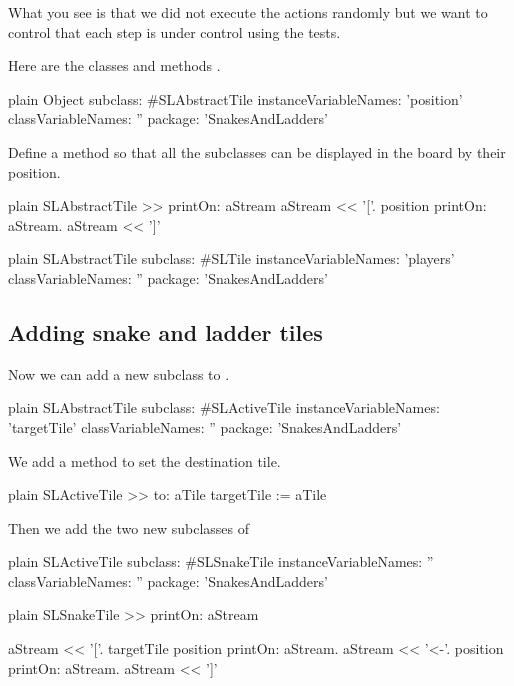 \documentclass[10pt,twoside,english]{_support/latex/sbabook/sbabook}
\begin{document}
What you see is that we did not execute the actions randomly but we want to control that each step is under control using the tests.

Here are the classes and methods .

\begin{displaycode}{plain}
Object subclass: #SLAbstractTile
	instanceVariableNames: 'position'
	classVariableNames: ''
	package: 'SnakesAndLadders'
\end{displaycode}

Define a  method so that all the subclasses can be displayed in the board by their position.

\begin{displaycode}{plain}
SLAbstractTile >> printOn: aStream
	aStream << '['.
	position printOn: aStream.
	aStream << ']'
\end{displaycode}

\begin{displaycode}{plain}
SLAbstractTile subclass: #SLTile
	instanceVariableNames: 'players'
	classVariableNames: ''
	package: 'SnakesAndLadders'
\end{displaycode}
\subsection{Adding snake and ladder tiles}
Now we can add a new subclass to .

\begin{displaycode}{plain}
SLAbstractTile subclass: #SLActiveTile
	instanceVariableNames: 'targetTile'
	classVariableNames: ''
	package: 'SnakesAndLadders'
\end{displaycode}

We add a method  to set the destination tile.

\begin{displaycode}{plain}
SLActiveTile >> to: aTile
	targetTile := aTile
\end{displaycode}

Then we add the two new subclasses of 

\begin{displaycode}{plain}
SLActiveTile subclass: #SLSnakeTile
	instanceVariableNames: ''
	classVariableNames: ''
	package: 'SnakesAndLadders'
\end{displaycode}

\begin{displaycode}{plain}
SLSnakeTile >> printOn: aStream

	aStream << '['.
	targetTile position printOn: aStream. 
	aStream << '<-'.
	position printOn: aStream.
	aStream << ']'
\end{displaycode}
\end{document}
